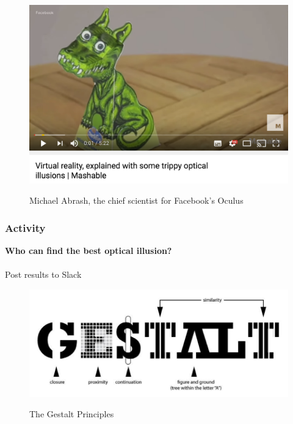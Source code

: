\begin{frame}
	\begin{figure}
		\href{https://www.youtube.com/watch?v=qD3w3cAhEYU}{ \includegraphics[scale=.4]{assets/optical}  }
		\caption{Michael Abrash, the chief scientist for Facebook's Oculus}
	\end{figure}
\end{frame}

\begin{frame}
	\frametitle{Activity}
	\textbf{Who can find the best optical illusion?} \\~\\
	
	Post results to Slack
	
\end{frame}

\begin{frame}
	\begin{figure}
		\href{http://graphicdesign.spokanefalls.edu/tutorials/process/gestaltprinciples/gestaltprinc.htm}{ \includegraphics[scale=.4]{assets/gestalt}  }
		\caption{The Gestalt Principles}
	\end{figure}
\end{frame}


